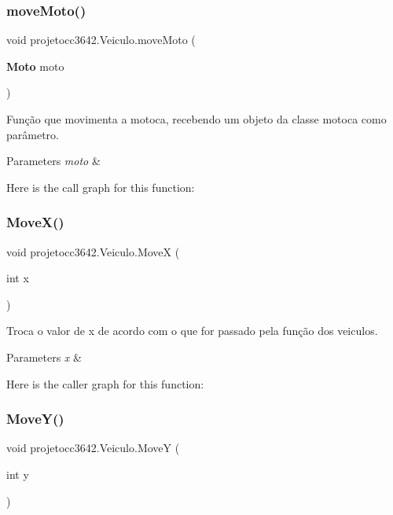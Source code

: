 \subsubsection{move\+Moto()}
{\footnotesize\ttfamily void projetocc3642.\+Veiculo.\+move\+Moto (\begin{DoxyParamCaption}\item[{\textbf{ Moto}}]{moto }\end{DoxyParamCaption})}



Função que movimenta a motoca, recebendo um objeto da classe motoca como parâmetro. 


\begin{DoxyParams}{Parameters}
{\em moto} & \\
\hline
\end{DoxyParams}
Here is the call graph for this function\+:
\mbox{\label{classprojetocc3642_1_1_veiculo_abe6eba890569d09d3f92738a00a3a0ec}} 
\subsubsection{Move\+X()}
{\footnotesize\ttfamily void projetocc3642.\+Veiculo.\+MoveX (\begin{DoxyParamCaption}\item[{int}]{x }\end{DoxyParamCaption})}



Troca o valor de x de acordo com o que for passado pela função dos veiculos. 


\begin{DoxyParams}{Parameters}
{\em x} & \\
\hline
\end{DoxyParams}
Here is the caller graph for this function\+:
\mbox{\label{classprojetocc3642_1_1_veiculo_a68533912c36c793eac7e4db9bfe93a5c}} 
\subsubsection{Move\+Y()}
{\footnotesize\ttfamily void projetocc3642.\+Veiculo.\+MoveY (\begin{DoxyParamCaption}\item[{int}]{y }\end{DoxyParamCaption})}



